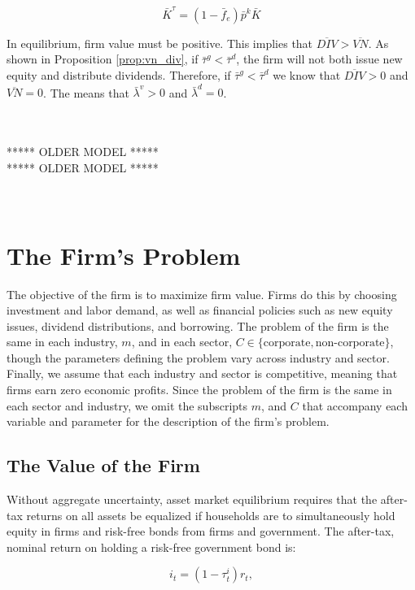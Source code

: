 \begin{equation}
\label{eqn:lom_ktau_ss}
\bar{K}^{\tau}=(1-\bar{f}_{e})\bar{p}^{k}\bar{K}
\end{equation}

In equilibrium, firm value must be positive.  This implies that $\overline{DIV}>\overline{VN}$.  As shown in Proposition \ref{prop:vn_div}, if $\bar{\tau}^{g}<\bar{\tau}^{d}$, the firm will not both issue new equity and distribute dividends.  Therefore, if $\bar{\tau}^{g}<\bar{\tau}^{d}$ we know that $\overline{DIV}>0$ and $\overline{VN}=0$.  The means that $\bar{\lambda}^{v}>0$ and $\bar{\lambda}^{d}=0$.  

\ \\
\ \\
***** OLDER MODEL *****\\
***** OLDER MODEL *****\\
\ \\
\ \\

\section{The Firm's Problem}

The objective of the firm is to maximize firm value.  Firms do this by choosing investment and labor demand, as well as financial policies such as new equity issues, dividend distributions, and borrowing.  The problem of the firm is the same in each industry, $m$, and in each sector, $C\in\{\text{corporate},\text{non-corporate}\}$, though the parameters defining the problem vary across industry and sector.  Finally, we assume that each industry and sector is competitive, meaning that firms earn zero economic profits.  Since the problem of the firm is the same in each sector and industry, we omit the subscripts $m$, and $C$ that accompany each variable and parameter for the description of the firm's problem.

\subsection{The Value of the Firm}

Without aggregate uncertainty, asset market equilibrium requires that the after-tax returns on all assets be equalized if households are to simultaneously hold equity in firms and risk-free bonds from firms and government.  The after-tax, nominal return on holding a risk-free government bond is:

\begin{equation}
\label{eqn:r}
i_{t}=(1-\tau^{i}_{t})r_{t},
\end{equation}

